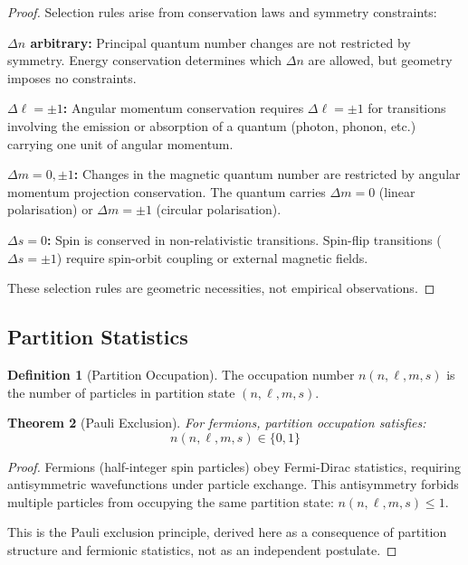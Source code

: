 \documentclass[11pt,twocolumn,a4paper]{article}
\newtheorem{theorem}{Theorem}[section]
\theoremstyle{definition}
\newtheorem{definition}[theorem]{Definition}
\theoremstyle{remark}
\begin{document}
\begin{proof}
Selection rules arise from conservation laws and symmetry constraints:

\textbf{$\Delta n$ arbitrary:} Principal quantum number changes are not restricted by symmetry. Energy conservation determines which $\Delta n$ are allowed, but geometry imposes no constraints.

\textbf{$\Delta \ell = \pm 1$:} Angular momentum conservation requires $\Delta \ell = \pm 1$ for transitions involving the emission or absorption of a quantum (photon, phonon, etc.) carrying one unit of angular momentum.

\textbf{$\Delta m = 0, \pm 1$:} Changes in the magnetic quantum number are restricted by angular momentum projection conservation. The quantum carries $\Delta m = 0$ (linear polarisation) or $\Delta m = \pm 1$ (circular polarisation).

\textbf{$\Delta s = 0$:} Spin is conserved in non-relativistic transitions. Spin-flip transitions ($\Delta s = \pm 1$) require spin-orbit coupling or external magnetic fields.

These selection rules are geometric necessities, not empirical observations.
\end{proof}

\subsection{Partition Statistics}

\begin{definition}[Partition Occupation]
\label{def:partition_occupation}
The occupation number $n(n,\ell,m,s)$ is the number of particles in partition state $(n,\ell,m,s)$.
\end{definition}

\begin{theorem}[Pauli Exclusion]
\label{thm:pauli_exclusion}
For fermions, partition occupation satisfies:
\begin{equation}
n(n,\ell,m,s) \in \{0,1\}
\label{eq:pauli_exclusion}
\end{equation}
\end{theorem}

\begin{proof}
Fermions (half-integer spin particles) obey Fermi-Dirac statistics, requiring antisymmetric wavefunctions under particle exchange. This antisymmetry forbids multiple particles from occupying the same partition state: $n(n,\ell,m,s) \leq 1$.

This is the Pauli exclusion principle, derived here as a consequence of partition structure and fermionic statistics, not as an independent postulate.
\end{proof}
\end{document}
